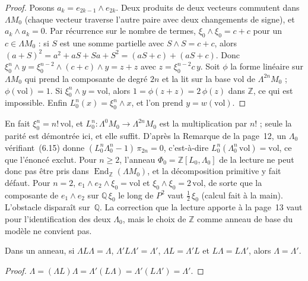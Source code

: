 \begin{proof}
Posons $a_k = e_{2k-1} \wedge e_{2k}$. Deux produits de deux vecteurs commutent dans $\Lambda M_0$ (chaque vecteur traverse l'autre paire avec deux changements de signe), et $a_k \wedge a_k = 0$. Par récurrence sur le nombre de termes, $\xi_0 \wedge \xi_0 = c + c$ pour un $c \in \Lambda M_0$ : si $S$ est une somme partielle avec $S \wedge S = c + c$, alors $(a + S)^2 = a^2 + aS + Sa + S^2 = (aS + c) + (aS + c)$. Donc $\xi_0^n \wedge y = \xi_0^{n-2} \wedge (c + c) \wedge y = z + z$ avec $z = \xi_0^{n-2} c\, y$. Soit $\phi$ la forme linéaire sur $\Lambda M_0$ qui prend la composante de degré $2n$ et la lit sur la base $\mathrm{vol}$ de $\Lambda^{2n} M_0$ ; $\phi(\mathrm{vol}) = 1$. Si $\xi_0^n \wedge y = \mathrm{vol}$, alors $1 = \phi(z + z) = 2\,\phi(z)$ dans $\mathbb Z$, ce qui est impossible. Enfin $L_0^n(x) = \xi_0^n \wedge x$, et l'on prend $y = w(\mathrm{vol})$.
\end{proof}

\begin{remarque}
En fait $\xi_0^n = n!\,\mathrm{vol}$, et $L_0^n \colon \Lambda^0 M_0 \to \Lambda^{2n} M_0$ est la multiplication par $n!$ ; seule la parité est démontrée ici, et elle suffit. D'après la Remarque de la page~12, un $\Lambda_0$ vérifiant~(6.15) donne $(L_0^n \Lambda_0^n - 1)\,\pi_{2n} = 0$, c'est-à-dire $L_0^n(\Lambda_0^n\, \mathrm{vol}) = \mathrm{vol}$, ce que l'énoncé exclut. Pour $n \geqslant 2$, l'anneau $\Phi_0 = \mathbb Z[L_0, \Lambda_0]$ de la lecture ne peut donc pas être pris dans $\operatorname{End}_{\mathbb Z}(\Lambda M_0)$, et la décomposition primitive y fait défaut. Pour $n = 2$, $e_1 \wedge e_2 \wedge \xi_0 = \mathrm{vol}$ et $\xi_0 \wedge \xi_0 = 2\,\mathrm{vol}$, de sorte que la composante de $e_1 \wedge e_2$ sur $\mathbb Q\,\xi_0$ le long de $P^2$ vaut $\tfrac12\,\xi_0$ (calcul fait à la main). L'obstacle disparaît sur~$\mathbb Q$. La correction que la lecture apporte à la page~13 vaut pour l'identification des deux $\Lambda_0$, mais le choix de $\mathbb Z$ comme anneau de base du modèle ne convient pas.
\end{remarque}

\begin{lemme}\label{lem:16-pseudo}
Dans un anneau, si $\Lambda L \Lambda = \Lambda$, $\Lambda' L \Lambda' = \Lambda'$, $\Lambda L = \Lambda' L$ et $L\Lambda = L \Lambda'$, alors $\Lambda = \Lambda'$.
\end{lemme}

\begin{proof}
$\Lambda = (\Lambda L)\Lambda = \Lambda'(L\Lambda) = \Lambda'(L\Lambda') = \Lambda'$.
\end{proof}

